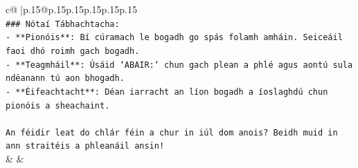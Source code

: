 \documentclass{article}
\begin{document}
{\begin{supertabular}{c@{$\;$}|p{.15\linewidth}@{}p{.15\linewidth}p{.15\linewidth}p{.15\linewidth}p{.15\linewidth}p{.15\linewidth}}
{{{\\ 
\texttt{\#\#\# Nótaí Tábhachtacha:} \\
\texttt{{-} **Pionóis**: Bí cúramach le bogadh go spás folamh amháin. Seiceáil faoi dhó roimh gach bogadh.} \\
\texttt{{-} **Teagmháil**: Úsáid `ABAIR:` chun gach plean a phlé agus aontú sula ndéanann tú aon bhogadh.} \\
\texttt{{-} **Éifeachtacht**: Déan iarracht an líon bogadh a íoslaghdú chun pionóis a sheachaint.} \\
\\ 
\texttt{An féidir leat do chlár féin a chur in iúl dom anois? Beidh muid in ann straitéis a phleanáil ansin!} \\
            }
        }
    }
    & & \\ \\


\end{supertabular}}
\end{document}

